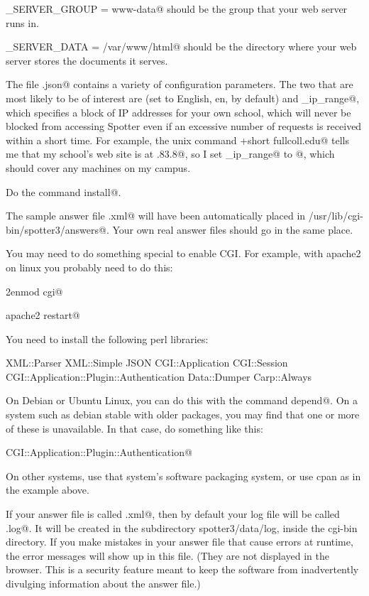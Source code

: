 \documentclass{doc}
\begin{document}
\verb@WEB_SERVER_GROUP = www-data@ should be the group that your web server runs in.

\verb@WEB_SERVER_DATA = /var/www/html@ should be the directory where your web server stores the documents it serves.

The file \verb@config.json@ contains a variety of configuration parameters. The two that are most
likely to be of interest are \verb@language@ (set to English, en, by default) and
\verb@immune_ip_range@, which specifies a block of IP addresses for your own school,
which will never be blocked from accessing Spotter even if an excessive number of
requests is received within a short time. For example, the unix command
\verb@dig +short fullcoll.edu@ tells me that my school's web site is
at .83.8@, so I set \verb@immune_ip_range@ to @,
which should cover any machines on my campus.

Do the command \verb@make install@.

The sample answer file \verb@sample.xml@ will have been automatically placed in
\verb@/usr/lib/cgi-bin/spotter3/answers@. Your own real answer files should go in the same
place.


You may need to do something special to enable CGI.
For example, with apache2 on linux you probably need to do this:

\verb@a2enmod cgi@

\verb@service apache2 restart@


You need to install the following perl libraries:

XML::Parser XML::Simple JSON CGI::Application CGI::Session
CGI::Application::Plugin::Authentication Data::Dumper Carp::Always

On Debian or Ubuntu Linux, you can do this with the command \verb@make depend@.
On a system such as debian stable with older packages, you may find that one or more of these is
unavailable. In that case, do something like this:

\verb@cpan CGI::Application::Plugin::Authentication@

On other systems, use that system's software packaging system, or use cpan as
in the example above.


If your answer file is called \verb@spotter.xml@, then by default your log file will be
called \verb@spotter.log@. It will be created in the subdirectory spotter3/data/log, inside the
cgi-bin directory.
If you make mistakes in your answer file that cause errors at runtime, the error
messages will show up in this file. (They are not displayed in the browser. This
is a security feature meant to keep the software from inadvertently divulging
information about the answer file.)
\end{document}
